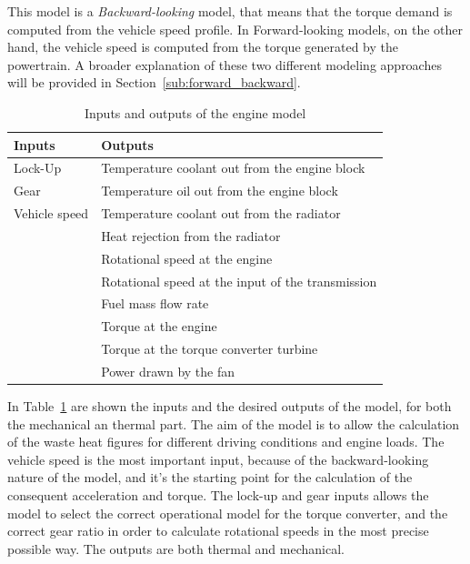 This model is a \emph{Backward-looking} model, that means that the torque demand is computed from the vehicle speed profile. In Forward-looking models, on the other hand, the vehicle speed is computed from the torque generated by the powertrain. A broader explanation of these two different modeling approaches will be provided in Section~\ref{sub:forward_backward}.
 
\begin{table}[]
  \centering
  \begin{tabular}{ll}
    \hline
    Inputs        & Outputs                                           \\ \hline
    Lock-Up       & Temperature coolant out from the engine block     \\
    Gear          & Temperature oil out from the engine block         \\
    Vehicle speed & Temperature coolant out from the radiator         \\
                  & Heat rejection from the radiator                  \\
                  & Rotational speed at the engine                    \\
                  & Rotational speed at the input of the transmission \\
                  & Fuel mass flow rate                               \\
                  & Torque at the engine                              \\
                  & Torque at the torque converter turbine            \\
                  & Power drawn by the fan                            \\ \hline
  \end{tabular}
  \caption{Inputs and outputs of the engine model\label{tab:inputs_outputs}}
\end{table}

In Table~\ref{tab:inputs_outputs} are shown the inputs and the desired outputs of the model, for both the mechanical an thermal part. The aim of the model is to allow the calculation of the waste heat figures for different driving conditions and engine loads. The vehicle speed is the most important input, because of the backward-looking nature of the model, and it's the starting point for the calculation of the consequent acceleration and torque. The lock-up and gear inputs allows the model to select the correct operational model for the torque converter, and the correct gear ratio in order to calculate rotational speeds in the most precise possible way. The outputs are both thermal and mechanical.


